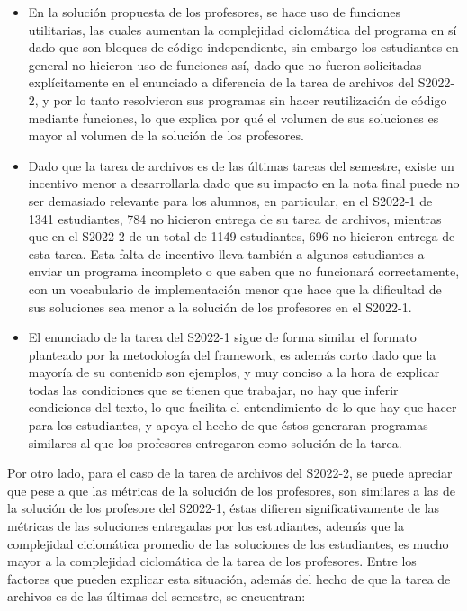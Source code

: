 \documentclass[letterpaper,12pt]{article}
\begin{document}
\begin{itemize}
  \item En la solución propuesta de los profesores, se hace uso de funciones utilitarias, las cuales aumentan la complejidad ciclomática del programa en sí dado que son bloques de código independiente, sin embargo los estudiantes en general no hicieron uso de funciones así, dado que no fueron solicitadas explícitamente en el enunciado a diferencia de la tarea de archivos del S2022-2, y por lo tanto resolvieron sus programas sin hacer reutilización de código mediante funciones, lo que explica por qué el volumen de sus soluciones es mayor al volumen de la solución de los profesores.
  \item Dado que la tarea de archivos es de las últimas tareas del semestre, existe un incentivo menor a desarrollarla dado que su impacto en la nota final puede no ser demasiado relevante para los alumnos, en particular, en el S2022-1 de 1341 estudiantes, 784 no hicieron entrega de su tarea de archivos, mientras que en el S2022-2 de un total de 1149 estudiantes, 696 no hicieron entrega de esta tarea. Esta falta de incentivo lleva también a algunos estudiantes a enviar un programa incompleto o que saben que no funcionará correctamente, con un vocabulario de implementación menor que hace que la dificultad de sus soluciones sea menor a la solución de los profesores en el S2022-1.
  \item El enunciado de la tarea del S2022-1 sigue de forma similar el formato planteado por la metodología del framework, es además corto dado que la mayoría de su contenido son ejemplos, y muy conciso a la hora de explicar todas las condiciones que se tienen que trabajar, no hay que inferir condiciones del texto, lo que facilita el entendimiento de lo que hay que hacer para los estudiantes, y apoya el hecho de que éstos generaran programas similares al que los profesores entregaron como solución de la tarea.
\end{itemize}

Por otro lado, para el caso de la tarea de archivos del S2022-2, se puede apreciar que pese a que las métricas de la solución de los profesores, son similares a las de la solución de los profesore del S2022-1, éstas difieren significativamente de las métricas de las soluciones entregadas por los estudiantes, además que la complejidad ciclomática promedio de las soluciones de los estudiantes, es mucho mayor a la complejidad ciclomática de la tarea de los profesores. Entre los factores que pueden explicar esta situación, además del hecho de que la tarea de archivos es de las últimas del semestre, se encuentran:
\end{document}
